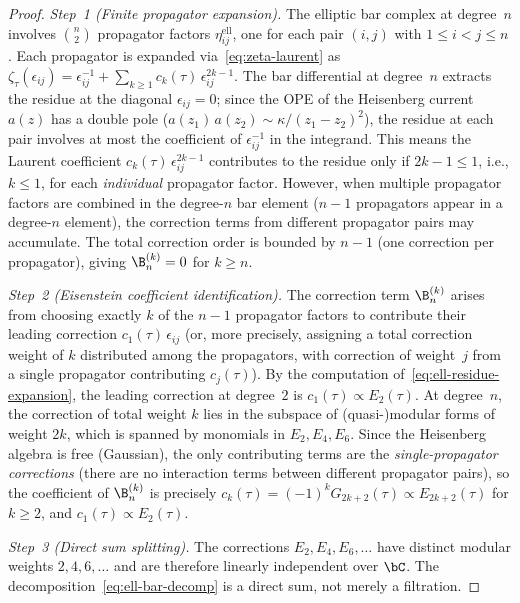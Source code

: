 \begin{proof}
\emph{Step~1 (Finite propagator expansion).}
The elliptic bar complex at degree~$n$ involves
$\binom{n}{2}$ propagator factors $\eta_{ij}^{\mathrm{ell}}$,
one for each pair $(i,j)$ with $1 \leq i < j \leq n$.
Each propagator is expanded via~\eqref{eq:zeta-laurent} as
$\zeta_\tau(\epsilon_{ij}) = \epsilon_{ij}^{-1} + \sum_{k \geq 1}
c_k(\tau)\,\epsilon_{ij}^{2k-1}$. The bar differential at
degree~$n$ extracts the residue at the diagonal
$\epsilon_{ij} = 0$; since the OPE of the Heisenberg current
$a(z)$ has a double pole ($a(z_1)\,a(z_2) \sim
\kappa/(z_1 - z_2)^2$), the residue at each pair involves
at most the coefficient of $\epsilon_{ij}^{-1}$ in the
integrand. This means the Laurent coefficient $c_k(\tau)\,
\epsilon_{ij}^{2k-1}$ contributes to the residue only if
$2k - 1 \leq 1$, i.e., $k \leq 1$, for each \emph{individual}
propagator factor. However, when multiple propagator factors
are combined in the degree-$n$ bar element ($n-1$ propagators
appear in a degree-$n$ element), the correction terms from
different propagator pairs may accumulate. The total correction
order is bounded by $n-1$ (one correction per propagator),
giving $\B^{(k)}_n = 0$ for $k \geq n$.

\emph{Step~2 (Eisenstein coefficient identification).}
The correction term $\B^{(k)}_n$ arises from choosing exactly
$k$ of the $n-1$ propagator factors to contribute their leading
correction $c_1(\tau)\,\epsilon_{ij}$ (or, more precisely,
assigning a total correction weight of $k$ distributed
among the propagators, with correction of weight~$j$ from
a single propagator contributing $c_j(\tau)$).
By the computation of~\eqref{eq:ell-residue-expansion}, the
leading correction at degree~$2$ is $c_1(\tau) \propto E_2(\tau)$.
At degree~$n$, the correction of total weight $k$ lies in the
subspace of (quasi-)modular forms of weight $2k$, which is
spanned by monomials in $E_2, E_4, E_6$. Since the Heisenberg
algebra is free (Gaussian), the only contributing terms are the
\emph{single-propagator corrections} (there are no interaction
terms between different propagator pairs), so the coefficient
of $\B^{(k)}_n$ is precisely $c_k(\tau) = (-1)^k G_{2k+2}(\tau)
\propto E_{2k+2}(\tau)$ for $k \geq 2$, and $c_1(\tau) \propto
E_2(\tau)$.

\emph{Step~3 (Direct sum splitting).}
The corrections $E_2, E_4, E_6, \ldots$ have distinct modular
weights $2, 4, 6, \ldots$ and are therefore linearly independent
over $\bC$. The decomposition~\eqref{eq:ell-bar-decomp}
is a direct sum, not merely a filtration.
\end{proof}


